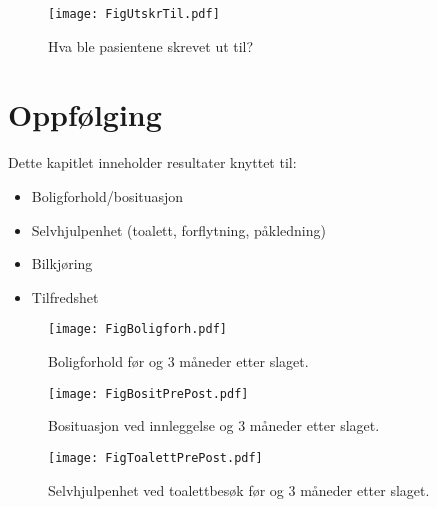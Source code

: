 \documentclass [norsk,a4paper,twoside]{article}\usepackage[]{graphicx}\usepackage[]{color}
\begin{document}
\begin{figure}[ht]
\centering \texttt{[image: FigUtskrTil.pdf]}
\caption{\label{fig:UtskrTil} Hva ble pasientene skrevet ut til?}
\end{figure}


\clearpage
\section{Oppfølging}

Dette kapitlet inneholder resultater knyttet til:
\begin{itemize}
	\item Boligforhold/bosituasjon
	\item Selvhjulpenhet (toalett, forflytning, påkledning)
	\item Bilkjøring
	\item Tilfredshet
\end{itemize}






\begin{figure}[ht]
\centering \texttt{[image: FigBoligforh.pdf]}
\caption{\label{fig:Boligforh} Boligforhold før og 3 måneder etter slaget.}
\end{figure}

\begin{figure}[ht]
\centering \texttt{[image: FigBositPrePost.pdf]}
\caption{\label{fig:BositPrePost} Bosituasjon ved innleggelse og 3 måneder etter slaget.}
\end{figure}



\begin{figure}[ht]
\centering \texttt{[image: FigToalettPrePost.pdf]}
\caption{\label{fig:ToalettPrePost} Selvhjulpenhet ved toalettbesøk før og 3 måneder etter slaget.}
\end{figure}
\end{document}
